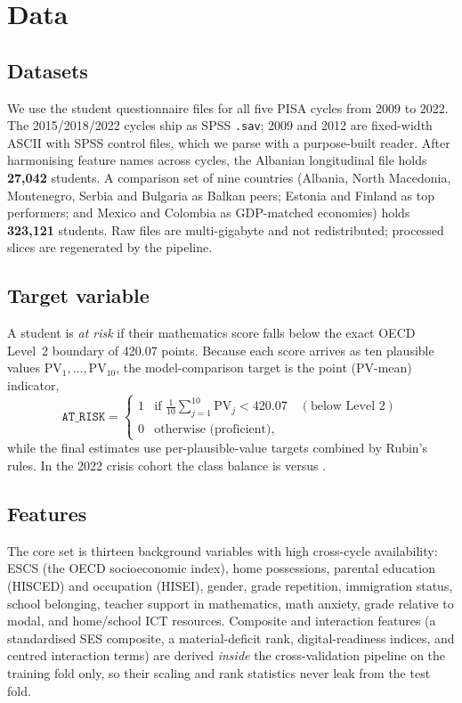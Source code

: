 \section{Data}
\label{sec:data}

\subsection{Datasets}
We use the student questionnaire files for all five PISA cycles from 2009 to 2022.
The 2015/2018/2022 cycles ship as SPSS \texttt{.sav}; 2009 and 2012 are fixed-width
ASCII with SPSS control files, which we parse with a purpose-built reader. After
harmonising feature names across cycles, the Albanian longitudinal file holds
\textbf{27{,}042} students. A comparison set of nine countries (Albania, North
Macedonia, Montenegro, Serbia and Bulgaria as Balkan peers; Estonia and Finland as top
performers; and Mexico and Colombia as GDP-matched economies) holds \textbf{323{,}121}
students. Raw files are multi-gigabyte and not redistributed; processed slices are
regenerated by the pipeline.

\subsection{Target variable}
A student is \emph{at risk} if their mathematics score falls below the exact OECD
Level~2 boundary of 420.07 points. Because each score arrives as ten plausible
values $\mathrm{PV}_1,\dots,\mathrm{PV}_{10}$, the model-comparison target is the
point (PV-mean) indicator,
\[
\texttt{AT\_RISK} =
\begin{cases}
1 & \text{if } \tfrac{1}{10}\sum_{j=1}^{10}\mathrm{PV}_j < 420.07 \quad(\text{below Level 2})\\[2pt]
0 & \text{otherwise (proficient),}
\end{cases}
\]
while the final estimates use per-plausible-value targets combined by Rubin's rules.
In the 2022 crisis cohort the class balance is  versus
.

\subsection{Features}
The core set is thirteen background variables with high cross-cycle availability:
ESCS (the OECD socioeconomic index), home possessions, parental education (HISCED)
and occupation (HISEI), gender, grade repetition, immigration status, school
belonging, teacher support in mathematics, math anxiety, grade relative to modal, and
home/school ICT resources. Composite and interaction features (a standardised SES
composite, a material-deficit rank, digital-readiness indices, and centred
interaction terms) are derived \emph{inside} the cross-validation pipeline on the
training fold only, so their scaling and rank statistics never leak from the test
fold.

